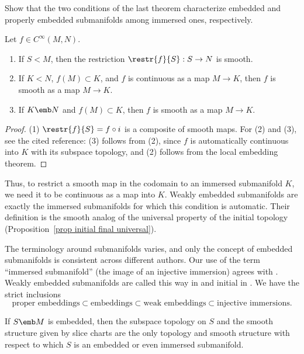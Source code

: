 \begin{xca}
    Show that the two conditions of the last theorem characterize embedded and properly embedded submanifolds among immersed ones, respectively.
\end{xca}

\begin{thm}\label{thm 5.27 Lee}\label{thm restrictions to submfds}
    Let $f\in C^\infty(M,N)$.
    \begin{enumerate}
        \item If $S<M$, then the restriction $\restr{f}{S}:S\to N$ is smooth.
        \item If $K<N$, $f(M)\subset K$, and $f$ is continuous as a map $M\to K$, then $f$ is smooth as a map $M\to K$.
        \item If $K\emb N$ and $f(M)\subset K$, then $f$ is smooth as a map $M\to K$.
    \end{enumerate}
\end{thm}
\begin{proof}
    (1) $\restr{f}{S}=f\circ i$ is a composite of smooth maps. For (2) and (3), see the cited reference: (3) follows from (2), since $f$ is automatically continuous into $K$ with its subspace topology, and (2) follows from the local embedding theorem.
\end{proof}

Thus, to restrict a smooth map in the codomain to an immersed submanifold $K$, we need it to be continuous as a map into $K$. Weakly embedded submanifolds are exactly the immersed submanifolds for which this condition is automatic. Their definition is the smooth analog of the universal property of the initial topology (Proposition~\ref{prop initial final universal}).

\begin{rem}
    The terminology around submanifolds varies, and only the concept of embedded submanifolds is consistent across different authors. Our use of the term ``immersed submanifold'' (the image of an injective immersion) agrees with \cite{Lee}. Weakly embedded submanifolds are called this way in \cite{Lee} and initial in \cite{RS1}. We have the strict inclusions
    \[\text{proper embeddings}\subset\text{embeddings}\subset\text{weak embeddings}\subset\text{injective immersions}.\]
\end{rem}

\begin{thm}\label{thm 5.31 Lee}
    If $S\emb M$ is embedded, then the subspace topology on $S$ and the smooth structure given by slice charts are the only topology and smooth structure with respect to which $S$ is an embedded or even immersed submanifold.
\end{thm}

